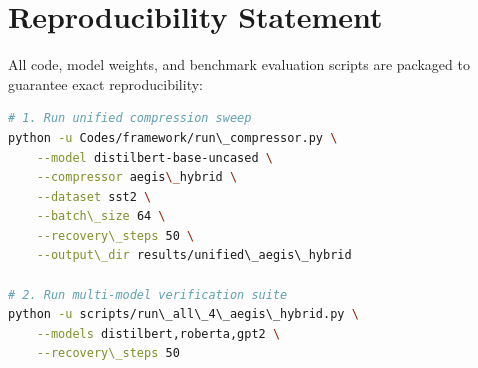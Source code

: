 \section{Reproducibility Statement}
All code, model weights, and benchmark evaluation scripts are packaged to guarantee exact reproducibility:
\begin{lstlisting}[language=bash]
# 1. Run unified compression sweep
python -u Codes/framework/run\_compressor.py \
    --model distilbert-base-uncased \
    --compressor aegis\_hybrid \
    --dataset sst2 \
    --batch\_size 64 \
    --recovery\_steps 50 \
    --output\_dir results/unified\_aegis\_hybrid

# 2. Run multi-model verification suite
python -u scripts/run\_all\_4\_aegis\_hybrid.py \
    --models distilbert,roberta,gpt2 \
    --recovery\_steps 50
\end{lstlisting}
